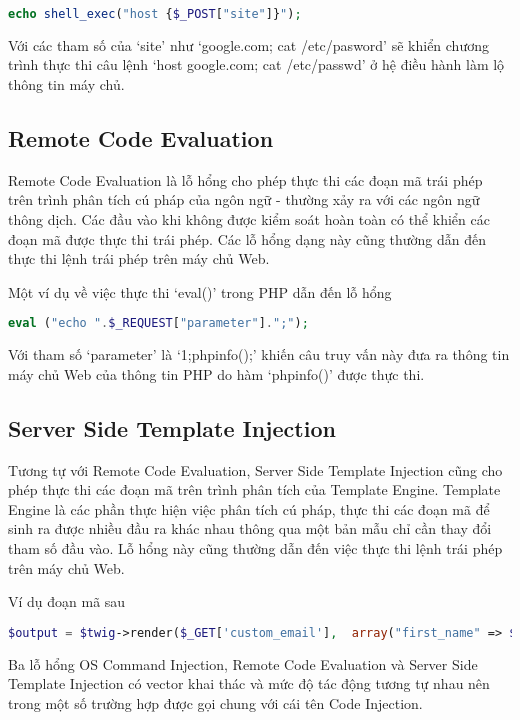 \documentclass[./../main.tex]{subfiles}
\begin{document}
\begin{lstlisting}[language=php, caption=OS Command Injection]
    echo shell_exec("host {$_POST["site"]}");
\end{lstlisting}

Với các tham số của `site' như `google.com; cat /etc/pasword' sẽ khiển chương trình thực thi câu lệnh `host google.com; cat /etc/passwd' ở hệ điều hành làm lộ thông tin máy chủ.

\subsection{Remote Code Evaluation}
Remote Code Evaluation là lỗ hổng cho phép thực thi các đoạn mã trái phép trên trình phân tích cú pháp của ngôn ngữ - thường xảy ra với các ngôn ngữ thông dịch. Các đầu vào khi không được kiểm soát hoàn toàn có thể khiển các đoạn mã được thực thi trái phép. Các lỗ hổng dạng này cũng thường dẫn đến thực thi lệnh trái phép trên máy chủ Web.

Một ví dụ về việc thực thi `eval()' trong PHP dẫn đến lỗ hổng

\begin{lstlisting}[language=php, caption=Remote Code Evaluation]
    eval ("echo ".$_REQUEST["parameter"].";");
\end{lstlisting}

Với tham số `parameter' là `1;phpinfo();' khiến câu truy vấn này đưa ra thông tin máy chủ Web của thông tin PHP do hàm `phpinfo()' được thực thi.

\subsection{Server Side Template Injection}
Tương tự với Remote Code Evaluation, Server Side Template Injection cũng cho phép thực thi các đoạn mã trên trình phân tích của Template Engine. Template Engine là các phần thực hiện việc phân tích cú pháp, thực thi các đoạn mã để sinh ra được nhiều đầu ra khác nhau thông qua một bản mẫu chỉ cần thay đổi tham số đầu vào. Lỗ hổng này cũng thường dẫn đến việc thực
thi lệnh trái phép trên máy chủ Web.

Ví dụ đoạn mã sau

\begin{lstlisting}[language=php, caption=Server Side Template Injection]
    $output = $twig->render($_GET['custom_email'],  array("first_name" => $user.first_name) );
\end{lstlisting}

Ba lỗ hổng OS Command Injection, Remote Code Evaluation và Server Side Template Injection có vector khai thác và mức độ tác động tương tự nhau nên trong một số trường hợp được gọi chung với cái tên Code Injection.
\end{document}
